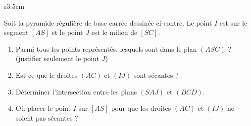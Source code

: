 
\begin{exercice}[\ldots/4]\label{exosmath-0700}

\begin{wrapfigure}{r}{3.5cm}
   \vspace{-0.5cm}        %
   \centering
   
\end{wrapfigure}

Soit la pyramide régulière de base carrée dessinée ci-contre. Le point \( I\) est sur le segment \( [AS]\) et le point \( J\) est le milieu de \( [SC]\).
        \begin{enumerate}
            \item
                Parmi tous les points représentés, lesquels sont dans le plan \( (ASC)\) ? (justifier seulement le point \( J\))
            \item
                Est-ce que le droites \( (AC)\) et \( (IJ)\) sont sécantes ?
            \item
                Déterminer l'intersection entre les plans \( (SAJ)\) et \( (BCD)\).
            \item
                Où placer le point \( I\) sur \( [AS]\) pour que les droites \( (AC)\) et \( (IJ)\) ne soient pas sécantes ?
        \end{enumerate}


\end{exercice}
